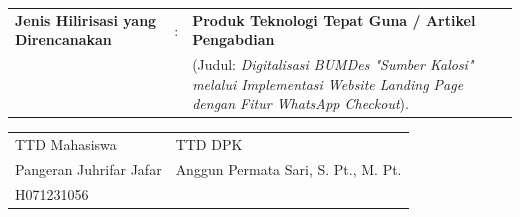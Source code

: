 \documentclass[12pt,a4paper]{article}
\begin{document}
\begin{tabularx}{\textwidth}{@{}L{5.5cm}cL{10cm}@{}}
\textbf{Jenis Hilirisasi yang Direncanakan} & : & \textbf{Produk Teknologi Tepat Guna / Artikel Pengabdian}\\
& & (Judul: \textit{Digitalisasi BUMDes "Sumber Kalosi" melalui Implementasi Website Landing Page dengan Fitur WhatsApp Checkout}). \\[0.5cm]

\end{tabularx}

\vspace{2cm}

\begin{tabularx}{\textwidth}{XX}
\centering TTD Mahasiswa & \centering TTD DPK \\[0.3cm]
\centering Pangeran Juhrifar Jafar & \centering Anggun Permata Sari, S. Pt., M. Pt. \\
\centering H071231056 & \centering 199410282024062003 \\
\end{tabularx}
\end{document}
